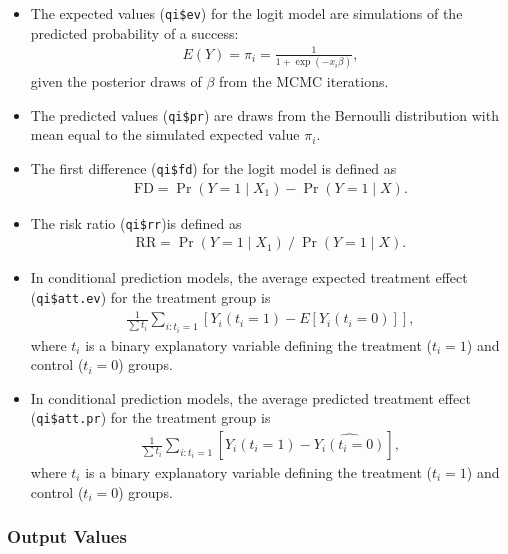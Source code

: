 \begin{itemize}
\item The expected values (\texttt{qi\$ev}) for the logit model are
simulations of the predicted probability of a success:
\begin{eqnarray*}
E(Y) = \pi_{i}= \frac{1}{1 + \exp(-x_{i} \beta)},
\end{eqnarray*}
given the posterior draws of $\beta$ from the MCMC iterations.

\item The predicted values (\texttt{qi\$pr}) are draws from the Bernoulli
distribution with mean equal to the simulated expected value $\pi_{i}$.

\item The first difference (\texttt{qi\$fd}) for the logit model is defined
as
\begin{eqnarray*}
\text{FD}=\Pr(Y=1\mid X_{1})-\Pr(Y=1\mid X).
\end{eqnarray*}

\item The risk ratio (\texttt{qi\$rr})is defined as
\begin{eqnarray*}
\text{RR}=\Pr(Y=1\mid X_{1})\ /\ \Pr(Y=1\mid X).
\end{eqnarray*}

\item In conditional prediction models, the average expected treatment effect
(\texttt{qi\$att.ev}) for the treatment group is
\begin{eqnarray*}
\frac{1}{\sum t_{i}}\sum_{i:t_{i}=1}[Y_{i}(t_{i}=1)-E[Y_{i}(t_{i}=0)]],
\end{eqnarray*}
where $t_{i}$ is a binary explanatory variable defining the treatment
($t_{i}=1$) and control ($t_{i}=0$) groups. 

\item In conditional prediction models, the average predicted treatment effect
(\texttt{qi\$att.pr}) for the treatment group is
\begin{eqnarray*}
\frac{1}{\sum t_{i}}\sum_{i:t_{i}=1}[Y_{i}(t_{i}=1)-\widehat{Y_{i}(t_{i}=0)}],
\end{eqnarray*}
where $t_{i}$ is a binary explanatory variable defining the treatment
($t_{i}=1$) and control ($t_{i}=0$) groups. 
\end{itemize}

\subsubsection{Output Values}

